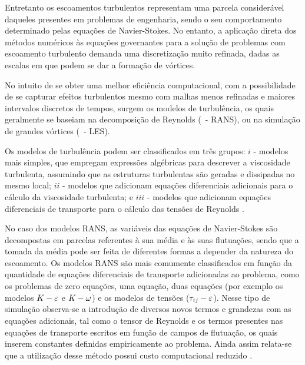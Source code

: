 Entretanto os escoamentos turbulentos representam uma parcela considerável daqueles presentes em problemas de engenharia, sendo o seu comportamento determinado pelas equações de Navier-Stokes. No entanto, a aplicação direta dos métodos numéricos às equações governantes para a solução de problemas com escoamento turbulento demanda uma discretização muito refinada, dadas as escalas em que podem se dar a formação de vórtices.



No intuito de se obter uma melhor eficiência computacional, com a possibilidade de se capturar efeitos turbulentos mesmo com malhas menos refinadas e maiores intervalos discretos de tempos, surgem os modelos de turbulência, os quais geralmente se baseiam na decomposição de Reynolds (\RANS\ - RANS), ou na simulação de grandes vórtices (\LES\ - LES).

Os modelos de turbulência podem ser classificados em três grupos: $i$ - modelos mais simples, que empregam expressões algébricas para descrever a viscosidade turbulenta, assumindo que as estruturas turbulentas são geradas e dissipadas no mesmo local; $ii$ - modelos que adicionam equações diferenciais adicionais para o cálculo da viscosidade turbulenta; e $iii$ - modelos que adicionam equações diferenciais de transporte para o cálculo das tensões de Reynolds \cite{souza2011revisao,alfonsi2009reynolds,teixeira2001simulaccao}.

No caso dos modelos RANS, as variáveis das equações de Navier-Stokes são decompostas em parcelas referentes à sua média e às suas flutuações, sendo que a tomada da média pode ser feita de diferentes formas a depender da natureza do escoamento. Os modelos RANS são mais comumente classificados em função da quantidade de equações diferenciais de transporte adicionadas ao problema, como os problemas de zero equações, uma equação, duas equações (por exemplo os modelos $K-\varepsilon$ e $K-\omega$) e os modelos de tensões ($\tau_{ij}-\varepsilon$). Nesse tipo de simulação observa-se a introdução de diversos novos termos e grandezas com as equações adicionais, tal como o tensor de Reynolds e os termos presentes nas equações de transporte escritos em função de campos de flutuação, os quais inserem constantes definidas empiricamente ao problema. Ainda assim relata-se que a utilização desse método possui custo computacional reduzido \cite{katopodes2019free}.

